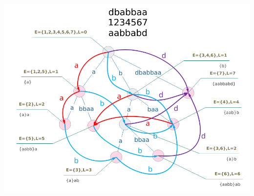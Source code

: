 \documentclass[9pt]{ctexart}
\begin{document}
\begin{center}
\includegraphics[width=0.8\linewidth]{assets/sam.png}
\end{center}
\end{document}
